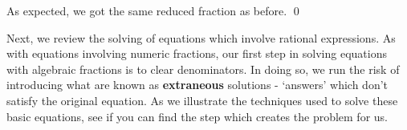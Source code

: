 \begin{ex}
\begin{enumerate}
\begin{itemize}
As expected, we got the same reduced fraction as before. \qed
\end{itemize}
																
\end{enumerate}

\end{ex}

Next, we review the solving of equations which involve rational expressions.  As with equations involving numeric fractions, our first step in solving equations with algebraic fractions is to clear denominators.  In doing so, we run the risk of introducing what are known as \textbf{extraneous} solutions - `answers' which don't satisfy the original equation.  As we illustrate the techniques used to solve these basic equations, see if you can find the step which creates the problem for us.


